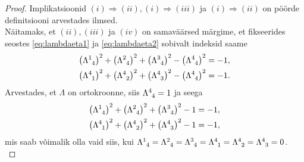 \documentclass[a4paper,12pt]{article}
\theoremstyle{plain}
\theoremstyle{definition}
\numberwithin{equation}{section}
\begin{document}
\begin{proof}
Implikatsioonid $(i) \Longrightarrow (ii), (i) \Longrightarrow (iii)$ ja $(i) \Longrightarrow (ii)$ on pöörde definitsiooni arvestades ilmsed. \\
Näitamaks, et $(ii), (iii)$ ja $(iv)$ on samaväärsed märgime, et fikseerides seostes \ref{eq:lambdaeta1} ja \ref{eq:lambdaeta2} sobivalt indeksid saame
\begin{align*}
\left(\Lambda\indices{^1_4}\right)^2 + \left(\Lambda\indices{^2_4}\right)^2 + \left(\Lambda\indices{^3_4}\right)^2 - \left(\Lambda\indices{^4_4}\right)^2 = -1, \\
\left(\Lambda\indices{^4_1}\right)^2 + \left(\Lambda\indices{^4_2}\right)^2 + \left(\Lambda\indices{^4_3}\right)^2 - \left(\Lambda\indices{^4_4}\right)^2 = -1.
\end{align*}
Arvestades, et $\Lambda$ on ortokroonne, siis $\Lambda\indices{^4_4} = 1$ ja seega  
\begin{align*}
\left(\Lambda\indices{^1_4}\right)^2 + \left(\Lambda\indices{^2_4}\right)^2 + \left(\Lambda\indices{^3_4}\right)^2 - 1 = -1, \\
\left(\Lambda\indices{^4_1}\right)^2 + \left(\Lambda\indices{^4_2}\right)^2 + \left(\Lambda\indices{^4_3}\right)^2 - 1 = -1,
\end{align*}
mis saab võimalik olla vaid siis, kui $\Lambda\indices{^1_4} = \Lambda\indices{^2_4} = \Lambda\indices{^3_4} = \Lambda\indices{^4_1} = \Lambda\indices{^4_2} = \Lambda\indices{^4_3} = 0$. \\


\end{proof}
\end{document}
